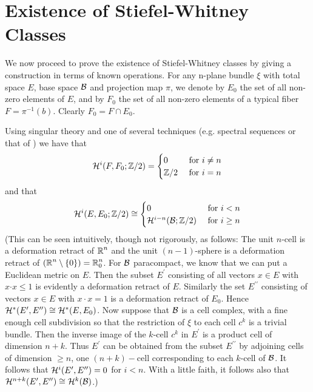 \chapter{Existence of Stiefel-Whitney Classes}\label{ch-8}
We now proceed to prove the existence of Stiefel-Whitney classes by giving a construction in terms of known operations. For any n-plane bundle $\xi$ with total space $E$, base space $\mathcal{B} $ and projection map $\pi$, we denote by $E_{0}$ the set of all non-zero elements of $E$, and by $F_{0}$ the set of all non-zero elements of a typical fiber $F=\pi^{-1}(b)$. Clearly $F_{0}= F \cap E_{0}$.

Using singular theory and one of several techniques (e.g. spectral sequences or that of ) we have that
\[\mathcal{H}^{i}(F, F_{0} ; \mathbb{Z} / 2)=\begin{cases}
	0 &\text { for } i \neq  n  \\
	\mathbb{Z} / 2 &\text { for } i= n 
	\end{cases}
\]
and that
\[\mathcal{H}^{i}(E, E_{0} ; \mathbb{Z} / 2)\cong\begin{cases}
	0& \text { for } i< n  \\
	\mathcal{H}^{i- n }(\mathcal{B}  ; \mathbb{Z} / 2)& \text { for } i \geq  n  
\end{cases}
\]
(This can be seen intuitively, though not rigorously, as follows: The unit $ n $-cell is a deformation retract of $\boldsymbol{\mathbb{R}}^{ n }$ and the unit $(n -1)$-sphere is a deformation retract of $(\boldsymbol{\mathbb{R}}^{ n }\setminus\{0\})=\boldsymbol{\mathbb{R}}_{0}^{ n } $. For $\mathcal{B} $ paracompact, we know that we can put a Euclidean metric on $E$. Then the subset $E^{\prime}$ consisting of all vectors $x \in E$ with $x \boldsymbol{\cdot} x \leq 1$ is evidently a deformation retract of $E$. Similarly the set $E^{\prime \prime}$ consisting of vectors $x \in E$ with $x \cdot x=1$ is a deformation retract of $E_{0} $. Hence $\mathcal{H}^{*}(E^{\prime}, E^{\prime \prime}) \cong \mathcal{H}^{*}(E, E_{0})$. Now suppose that $\mathcal{B} $ is a cell complex, with a fine enough cell subdivision so that the restriction of $\xi$ to each cell $c^{k}$ is a trivial bundle. Then the inverse image of the $k$-cell $ c^{k}$ in $E^{\prime}$ is a product cell of dimension $ n +k$. Thus $E^{\prime}$ can be obtained from the subset $E^{\prime \prime}$ by adjoining cells of dimension $\geq  n $, one $( n +k)-$cell corresponding to each $k$-cell of $\mathcal{B} $. It follows that $\mathcal{H}^{i}(E^{\prime}, E^{\prime \prime})=0$ for $i< n $. With a little faith, it follows also that $\mathcal{H}^{ n +k}(E^{\prime}, E^{\prime \prime}) \cong \mathcal{H}^{k}(\mathcal{B} )$.)

